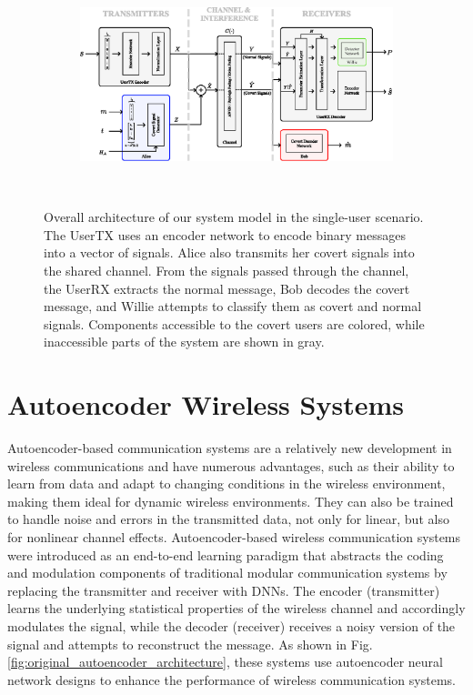 \begin{figure}[thp]
	\center
	\begin{subfigure}{0.7\textwidth}
		\includegraphics[width=\linewidth]{figs/system_architecture}
	\end{subfigure}
	\\
	\caption{Overall architecture of our system model in the single-user scenario. The UserTX uses an encoder network to encode binary messages into a vector of signals. Alice also transmits her covert signals into the shared channel. From the signals passed through the channel, the UserRX extracts the normal message, Bob decodes the covert message, and Willie attempts to classify them as covert and normal signals. Components accessible to the covert users are colored, while inaccessible parts of the system are shown in gray.}	
	\label{fig:system_architecture}
\end{figure}
\section{Autoencoder Wireless Systems}

Autoencoder-based communication systems are a relatively new development in wireless communications and have numerous advantages, such as their ability to learn from data and adapt to changing conditions in the wireless environment, making them ideal for dynamic wireless environments. They can also be trained to handle noise and errors in the transmitted data, not only for linear, but also for nonlinear channel effects. Autoencoder-based wireless communication systems were introduced as an end-to-end learning paradigm that abstracts the coding and modulation components of traditional modular communication systems by replacing the transmitter and receiver with DNNs. The encoder (transmitter) learns the underlying statistical properties of the wireless channel and accordingly modulates the signal, while the decoder (receiver) receives a noisy version of the signal and attempts to reconstruct the message. As shown in Fig. \ref{fig:original_autoencoder_architecture}, these systems use autoencoder neural network designs \cite{baldi2012autoencoders} to enhance the performance of wireless communication systems.

